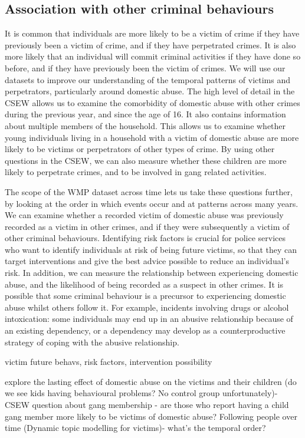 \documentclass[12pt, letterpaper]{article}
\begin{document}
\subsection{Association with other criminal behaviours}

It is common that individuals are more likely to be a victim of crime if they have previously been a victim of crime, and if they have perpetrated crimes. It is also more likely that an individual will commit criminal activities if they have done so before, and if they have previously been the victim of crimes. We will use our datasets to improve our understanding of the temporal patterns of victims and perpetrators, particularly around domestic abuse. The high level of detail in the CSEW allows us to examine the comorbidity of domestic abuse with other crimes during the previous year, and since the age of 16. It also contains information about  multiple members of the household. This allows us to examine whether young individuals living in a household with a victim of domestic abuse are more likely to be victims or perpetrators of other types of crime. By using other questions in the CSEW, we can also measure whether these children are more likely to perpetrate crimes, and to be involved in gang related activities.

The scope of the WMP dataset across time lets us take these questions further, by looking at the order in which events occur and at patterns across many years. We can examine whether a recorded victim of domestic abuse was previously recorded as a victim in other crimes, and if they were subsequently a victim of other criminal behaviours. Identifying risk factors is crucial for police services who want to identify individuals at risk of being future victims, so that they can target interventions and give the best advice possible to reduce an individual's risk. In addition, we can measure the relationship between experiencing domestic abuse, and the likelihood of being recorded as a suspect in other crimes. It is possible that some criminal behaviour is a precursor to experiencing domestic abuse whilst others follow it. For example, incidents involving drugs or alcohol intoxication: some individuals may end up in an abusive relationship because of an existing dependency, or a dependency may develop as a counterproductive strategy of coping with the abusive relationship. 


victim future behavs, risk factors, intervention possibility

 explore the lasting effect of domestic abuse on the victims and their children (do we see kids having behavioural problems? No control group unfortunately)- CSEW question about gang membership - are those who report having a child gang member more likely to be victims of domestic abuse? Following people over time (Dynamic topic modelling for victims)- what’s the temporal order? 
\end{document}
